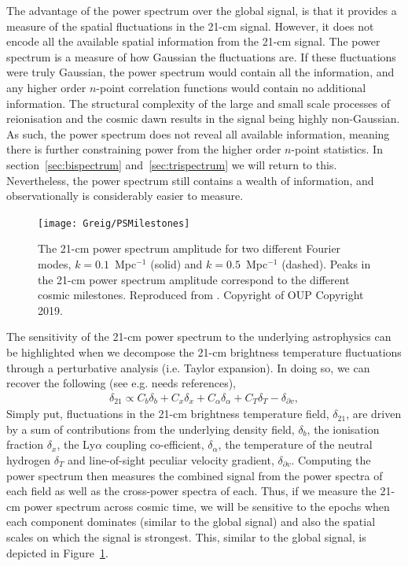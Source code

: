 The advantage of the power spectrum over the global signal, is that it provides a measure of the spatial fluctuations in the 21-cm signal. However, it does not encode all the available spatial information from the 21-cm signal. The power spectrum is a measure of how Gaussian the fluctuations are. If these fluctuations were truly Gaussian, the power spectrum would contain all the information, and any higher order $n$-point correlation functions would contain no additional information. The structural complexity of the large and small scale processes of reionisation and the cosmic dawn results in the signal being highly non-Gaussian. As such, the power spectrum does not reveal all available information, meaning there is further constraining power from the higher order $n$-point statistics. In section~\ref{sec:bispectrum} and~\ref{sec:trispectrum}  we will return to this. Nevertheless, the power spectrum still contains a wealth of information, and observationally is considerably easier to measure.

\begin{figure}[]
\begin{center}
\texttt{[image: Greig/PSMilestones]}
\end{center}
\caption{The 21-cm power spectrum amplitude for two different Fourier modes, $k=0.1$~Mpc$^{-1}$ (solid) and $k=0.5$~Mpc$^{-1}$ (dashed). Peaks in the 21-cm power spectrum amplitude correspond to the different cosmic milestones. Reproduced from \cite{Mesinger:2016}. Copyright of OUP Copyright 2019.}
\label{fig:PSMilestones}
\end{figure}

The sensitivity of the 21-cm power spectrum to the underlying astrophysics can be highlighted when we decompose the 21-cm brightness temperature fluctuations through a perturbative analysis (i.e. Taylor expansion). In doing so, we can recover the following (see e.g. {\color{red} needs references}),
\begin{eqnarray}
\delta_{21} \propto C_{b}\delta_{b} + C_{x}\delta_{x} + C_{\alpha}\delta_{\alpha} + C_{T}\delta_{T} - \delta_{\partial v},
\end{eqnarray}
Simply put, fluctuations in the 21-cm brightness temperature field, $\delta_{21}$, are driven by a sum of contributions from the underlying density field, $\delta_{b}$, the ionisation fraction $\delta_{x}$, the Ly$\alpha$ coupling co-efficient, $\delta_{\alpha}$, the temperature of the neutral hydrogen $\delta_{T}$ and line-of-sight peculiar velocity gradient, $\delta_{\partial v}$. Computing the power spectrum then measures the combined signal from the power spectra of each field as well as the cross-power spectra of each. Thus, if we measure the 21-cm power spectrum across cosmic time, we will be sensitive to the epochs when each component dominates (similar to the global signal) and also the spatial scales on which the signal is strongest. This, similar to the global signal, is depicted in Figure~\ref{fig:PSMilestones}.

